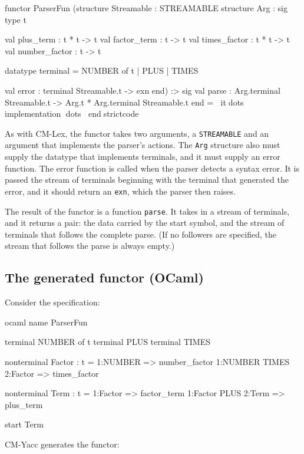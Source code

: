 \documentclass[10pt]{article}
\begin{document}
\begin{strictcode}
\begin{strictcode}
\begin{strictcode}
\begin{strictcode}
\begin{strictcode}
\begin{strictcode}
\begin{strictcode}
\begin{strictcode}
functor ParserFun
   (structure Streamable : STREAMABLE
    structure Arg :
       sig
          type t

          val plus_term : t * t -> t
          val factor_term : t -> t
          val times_factor : t * t -> t
          val number_factor : t -> t

          datatype terminal =
             NUMBER of t
           | PLUS
           | TIMES

          val error : terminal Streamable.t -> exn
       end)
   :>
   sig
      val parse : Arg.terminal Streamable.t -> Arg.t * Arg.terminal Streamable.t
   end
= itdots implementation dots
endstrictcode

As with CM-Lex, the functor takes two arguments, a {\tt STREAMABLE}
and an argument that implements the parser's actions.  The {\tt Arg}
structure also must supply the datatype that implements terminals, and
it must supply an error function.  The error function is called when
the parser detects a syntax error.  It is passed the stream of
terminals beginning with the terminal that generated the error, and it
should return an {\tt exn}, which the parser then raises.

The result of the functor is a function {\tt parse}.  It takes in a
stream of terminals, and it returns a pair: the data carried by the
start symbol, and the stream of terminals that follows the complete
parse.  (If no followers are specified, the stream that follows the
parse is always empty.)



\subsection{The generated functor (OCaml)}

Consider the specification:

\begin{code}
ocaml
name ParserFun

terminal NUMBER of t
terminal PLUS
terminal TIMES

nonterminal Factor : t =
  1:NUMBER => number_factor
  1:NUMBER TIMES 2:Factor => times_factor

nonterminal Term : t =
  1:Factor => factor_term
  1:Factor PLUS 2:Term => plus_term

start Term
\end{code}

CM-Yacc generates the functor:


\end{strictcode}
\end{strictcode}
\end{strictcode}
\end{strictcode}
\end{strictcode}
\end{strictcode}
\end{strictcode}
\end{strictcode}
\end{document}
